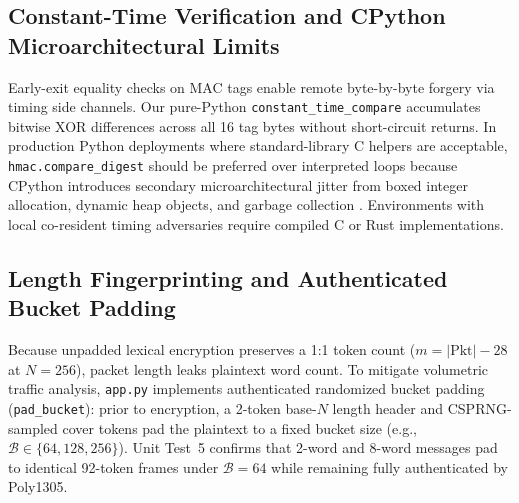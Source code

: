 \documentclass[conference]{IEEEtran}
\begin{document}
\subsection{Constant-Time Verification and CPython Microarchitectural Limits}
Early-exit equality checks on MAC tags enable remote byte-by-byte forgery via timing side channels. Our pure-Python \texttt{constant\_time\_compare} accumulates bitwise XOR differences across all 16 tag bytes without short-circuit returns. In production Python deployments where standard-library C helpers are acceptable, \texttt{hmac.compare\_digest} should be preferred over interpreted loops because CPython introduces secondary microarchitectural jitter from boxed integer allocation, dynamic heap objects, and garbage collection \cite{aamir2021chacha20}. Environments with local co-resident timing adversaries require compiled C or Rust implementations.

\subsection{Length Fingerprinting and Authenticated Bucket Padding}
Because unpadded lexical encryption preserves a 1:1 token count ($m = |\text{Pkt}| - 28$ at $N=256$), packet length leaks plaintext word count. To mitigate volumetric traffic analysis, \texttt{app.py} implements authenticated randomized bucket padding (\texttt{pad\_bucket}): prior to encryption, a 2-token base-$N$ length header and CSPRNG-sampled cover tokens pad the plaintext to a fixed bucket size (e.g., $\mathcal{B} \in \{64, 128, 256\}$). Unit Test~5 confirms that 2-word and 8-word messages pad to identical 92-token frames under $\mathcal{B}=64$ while remaining fully authenticated by Poly1305.
\end{document}
